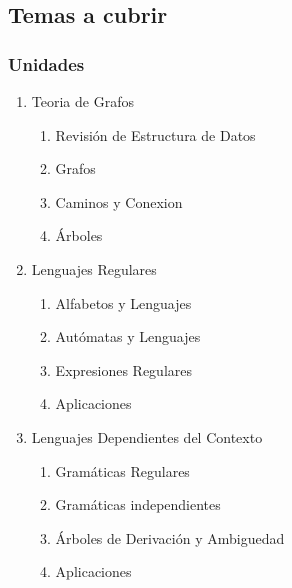 
\begin{frame}
\section{Temas a cubrir}
\frametitle{Unidades }
\begin{enumerate}

\item Teoria de Grafos
\begin{enumerate}
\item Revisión de Estructura de Datos 
\item Grafos
\item Caminos y Conexion
\item Árboles
\end{enumerate}

\item Lenguajes Regulares
\begin{enumerate}
\item Alfabetos y Lenguajes
\item Autómatas y Lenguajes
\item Expresiones Regulares
\item Aplicaciones
\end{enumerate}

\item Lenguajes Dependientes del Contexto
\begin{enumerate}
\item Gramáticas Regulares
\item Gramáticas independientes
\item Árboles de Derivación y Ambiguedad
\item Aplicaciones
\end{enumerate}

\end{enumerate}

\end{frame}
